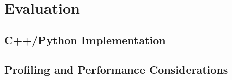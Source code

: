 \section{Evaluation}
\label{sec:Eval}

\subsection{C++/Python Implementation}

\subsection{Profiling and Performance Considerations}
